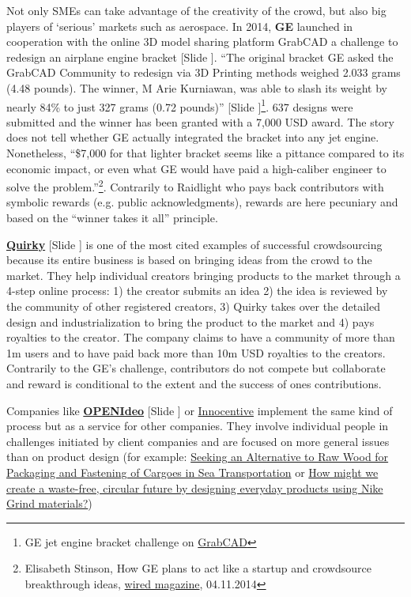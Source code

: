 \documentclass{article}
\newcounter{slide}
\begin{document}
Not only SMEs can take advantage of the creativity of the crowd, but also big players of `serious' markets such as aerospace. In 2014, \textbf{GE} launched in cooperation with the online 3D model sharing platform GrabCAD a challenge to redesign an airplane engine bracket {\color{blue} [Slide ]}. ``The original bracket GE asked the GrabCAD Community to redesign via 3D Printing methods weighed 2.033 grams (4.48 pounds). The winner, M Arie Kurniawan, was able to slash its weight by nearly 84\% to just 327 grams (0.72 pounds)''{\color{blue} [Slide ]}\footnote{GE jet engine bracket challenge on \href{https://grabcad.com/challenges/ge-jet-engine-bracket-challenge}{GrabCAD}}. 637 designs were submitted and the winner has been granted with a 7,000 USD award. The story does not tell whether GE actually integrated the bracket into any jet engine. Nonetheless, ``\$7,000 for that lighter bracket seems like a pittance compared to its economic impact, or even what GE would have paid a high-caliber engineer to solve the problem.''\footnote{Elisabeth Stinson, How GE plans to act like a startup and crowdsource breakthrough ideas, \href{https://www.wired.com/2014/04/how-ge-plans-to-act-like-a-startup-and-crowdsource-great-ideas/}{wired magazine}, 04.11.2014}. Contrarily to Raidlight who pays back contributors with symbolic rewards (e.g. public acknowledgments), rewards are here pecuniary and based on the ``winner takes it all'' principle.

\textbf{\href{https://quirky.com}{Quirky}} {\color{blue}[Slide ]} is one of the most cited examples of successful crowdsourcing because its entire business is based on bringing ideas from the crowd to the market. They help individual creators bringing products to the market through a 4-step online process: 1) the creator submits an idea 2) the idea is reviewed by the community of other registered creators, 3) Quirky takes over the detailed design and industrialization to bring the product to the market and 4) pays royalties to the creator. The company claims to have a community of more than 1m users and to have  paid back more than 10m USD royalties to the creators. Contrarily to the GE's challenge, contributors do not compete but collaborate and reward is conditional to the extent and the success of ones contributions.

Companies like \textbf{\href{https://www.openideo.com/}{OPENIdeo}} {\color{blue}[Slide ]} or \href{https://www.innocentive.com/}{Innocentive} implement the same kind of process but as a service for other companies. They involve individual people in challenges initiated by client companies and are focused on more general issues than on product design (for example: \href{https://www.innocentive.com/ar/challenge/9934083}{Seeking an Alternative to Raw Wood for Packaging and Fastening of Cargoes in Sea Transportation} or \href{https://www.openideo.com/challenge-briefs/nike-design-with-grind}{How might we create a waste-free, circular future by designing everyday products using Nike Grind materials?})
\end{document}
